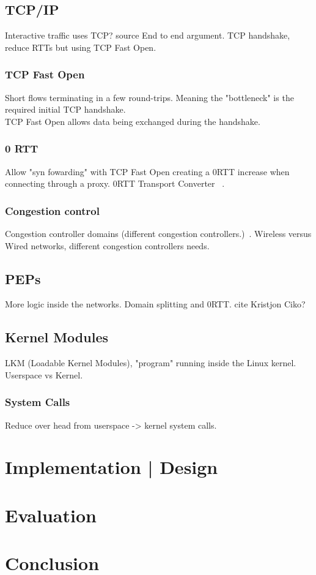 \documentclass[a4paper,english, 11pt]{report}
\begin{document}
\section{TCP/IP}

Interactive traffic uses TCP? {source}
End to end argument.
TCP handshake, reduce RTTs but using TCP Fast Open.
\subsection{TCP Fast Open}
Short flows terminating in a few round-trips. Meaning the "bottleneck" is the required initial TCP handshake.\\
TCP Fast Open allows data being exchanged during the handshake. 

\subsection{0 RTT}
Allow "syn fowarding" with TCP Fast Open creating a 0RTT increase when connecting through a proxy.
0RTT Transport Converter ~\cite{rfc8803}.

\subsection{Congestion control}
Congestion controller domains (different congestion controllers.)~\cite{rfc5783}.
Wireless versus Wired networks, different congestion controllers needs.

\section{PEPs}
More logic inside the networks. Domain splitting and 0RTT. {cite Kristjon Ciko?}

\section{Kernel Modules}
LKM (Loadable Kernel Modules), "program" running inside the Linux kernel.
Userspace vs Kernel.
\subsection{System Calls}
Reduce over head from userspace -> kernel system calls.

\chapter{Implementation | Design}
\chapter{Evaluation}
\chapter{Conclusion}

{}

\end{document}
